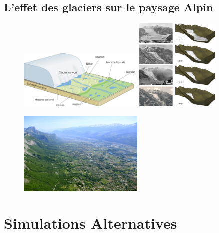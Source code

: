 \documentclass{beamer}
\begin{document}
\subsection{L'effet des glaciers sur le paysage Alpin}
\begin{frame}
	\begin{center}
		\begin{figure}
			\includegraphics[width=6cm]{Images/Images_Alexis/glacier_reculon.png}
			\includegraphics[width=4cm]{Images/Images_Alexis/glaciers_img3.png}
		\end{figure}
		\begin{figure}
			\includegraphics[width=6cm]{Images/Images_Alexis/gresivaudan.jpg}
		\end{figure}
	\end{center}
\end{frame}


\section{Simulations Alternatives}
\end{document}
